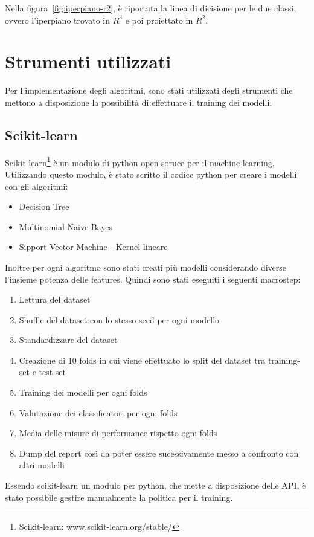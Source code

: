 \documentclass[oneside]{book}
\begin{document}
\noindent
Nella figura~\ref{fig:iperpiano-r2}, è riportata la linea di dicisione per le due classi, ovvero l'iperpiano trovato in $R^3$ e poi proiettato in $R^2$.

\section{Strumenti utilizzati}
Per l'implementazione degli algoritmi, sono stati utilizzati degli strumenti che mettono a disposizione la possibilità di effettuare il training dei modelli.

\subsection{Scikit-learn}
Scikit-learn\footnote{Scikit-learn: www.scikit-learn.org/stable/} è un modulo di python open soruce per il machine learning. Utilizzando questo modulo, è stato scritto il codice python per creare i modelli con gli algoritmi:
\begin{itemize}
	\item Decision Tree
	\item Multinomial Naive Bayes
	\item Sipport Vector Machine - Kernel lineare
	
\end{itemize}
Inoltre per ogni algoritmo sono stati creati più modelli considerando diverse l'insieme potenza delle features. Quindi sono stati eseguiti i seguenti macrostep:
\begin{enumerate}
	\item Lettura del dataset
	\item Shuffle del dataset con lo stesso seed per ogni modello
	\item Standardizzare del dataset
	\item Creazione di 10 folds in cui viene effettuato lo split del dataset tra training-set e test-set
	\item Training dei modelli per ogni folds
	\item Valutazione dei classificatori per ogni folds
	\item Media delle misure di performance rispetto ogni folds
	\item Dump del report così da poter essere sucessivamente messo a confronto con altri modelli
\end{enumerate}
Essendo scikit-learn un modulo per python, che mette a disposizione delle API, è stato possibile gestire manualmente la politica per il training.
\end{document}
